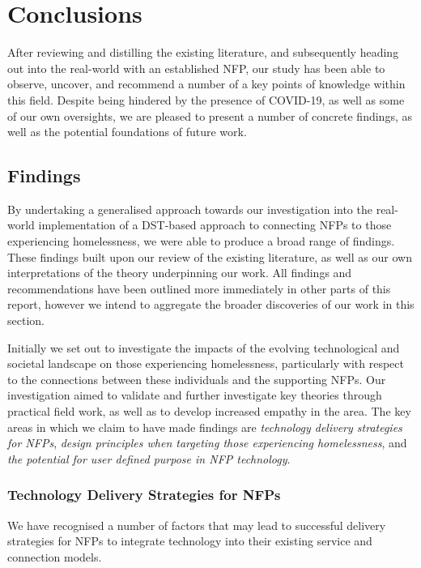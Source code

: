 \chapter{Conclusions}

After reviewing and distilling the existing literature, and subsequently heading out into the real-world with an established NFP, our study has been able to observe, uncover, and recommend a number of a key points of knowledge within this field. Despite being hindered by the presence of COVID-19, as well as some of our own oversights, we are pleased to present a number of concrete findings, as well as the potential foundations of future work.

\section{Findings}

By undertaking a generalised approach towards our investigation into the real-world implementation of a DST-based approach to connecting NFPs to those experiencing homelessness, we were able to produce a broad range of findings. These findings built upon our review of the existing literature, as well as our own interpretations of the theory underpinning our work. All findings and recommendations have been outlined more immediately in other parts of this report, however we intend to aggregate the broader discoveries of our work in this section.

Initially we set out to investigate the impacts of the evolving technological and societal landscape on those experiencing homelessness, particularly with respect to the connections between these individuals and the supporting NFPs. Our investigation aimed to validate and further investigate key theories through practical field work, as well as to develop increased empathy in the area. The key areas in which we claim to have made findings are \emph{technology delivery strategies for NFPs}, \emph{design principles when targeting those experiencing homelessness}, and \emph{the potential for user defined purpose in NFP technology}.

\subsection{Technology Delivery Strategies for NFPs}

We have recognised a number of factors that may lead to successful delivery strategies for NFPs to integrate technology into their existing service and connection models. 

